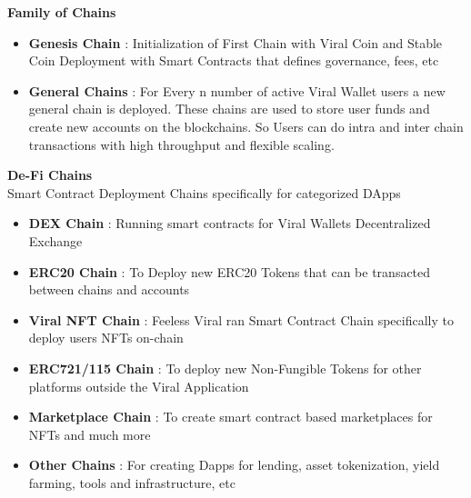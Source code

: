 \documentclass[10pt]{article}
\begin{document}
\textbf{Family of Chains}\\

\begin{itemize}[leftmargin=+0.2in]
\item \textbf{Genesis Chain} : Initialization of First Chain with Viral Coin and Stable Coin Deployment with Smart Contracts that defines governance, fees, etc\\

\item \textbf{General Chains} : For Every n number of active Viral Wallet users a new general chain is deployed. These chains are used to store user funds and create new accounts on the blockchains. So Users can do intra and inter chain transactions with high throughput and flexible scaling.\\
\end{itemize}
\textbf{De-Fi Chains}\\
Smart Contract Deployment Chains specifically for categorized DApps\\
\begin{itemize}[leftmargin=+0.2in]

\item \textbf{DEX Chain} : Running smart contracts for Viral Wallet\textsc{}s Decentralized Exchange

\item \textbf{ERC20 Chain} : To Deploy new ERC20 Tokens that can be transacted between chains and accounts

\item \textbf{Viral NFT Chain} : Feeless Viral ran Smart Contract Chain specifically to deploy user\textsc{}s NFTs on-chain

\item \textbf{ERC721/115 Chain} : To deploy new Non-Fungible Tokens for other platforms outside the Viral Application

\item \textbf{Marketplace Chain} : To create smart contract based marketplaces for NFTs and much more

\item \textbf{Other Chains} : For creating Dapps for lending, asset tokenization, yield farming, tools and infrastructure, etc
\end{itemize}
\end{document}
